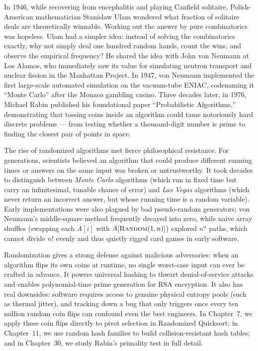 \begin{historybox}
In 1946, while recovering from encephalitis and playing Canfield solitaire, Polish-American
mathematician Stanislaw Ulam wondered what fraction of solitaire deals are theoretically winnable.
Working out the answer by pure combinatorics was hopeless. Ulam had a simpler idea:
instead of solving the combinatorics exactly, why not simply deal one hundred random hands, count the
wins, and observe the empirical frequency? He shared the idea with John von Neumann at Los Alamos,
who immediately saw its value for simulating neutron transport and nuclear fission in
the Manhattan Project. In 1947, von Neumann implemented the first large-scale automated simulation
on the vacuum-tube ENIAC, codenaming it ``Monte Carlo'' after the Monaco gambling casino. Three
decades later, in 1976, Michael Rabin published his foundational paper ``Probabilistic Algorithms,''
demonstrating that tossing coins inside an algorithm could tame notoriously hard discrete problems
--- from testing whether a thousand-digit number is prime to finding the closest pair of points in
space.

The rise of randomized algorithms met fierce philosophical resistance. For generations, scientists
believed an algorithm that could produce different running times or answers on the same input was
broken or untrustworthy. It took decades to distinguish between \emph{Monte Carlo} algorithms (which
run in fixed time but carry an infinitesimal, tunable chance of error) and \emph{Las Vegas}
algorithms (which never return an incorrect answer, but whose running time is a random variable).
Early implementations were also plagued by bad pseudo-random generators; von Neumann's middle-square
method frequently decayed into zero, while naive array shuffles (swapping each $A[i]$ with
$A[\textsc{Random}(1, n)]$) explored $n^n$ paths, which cannot divide $n!$ evenly and thus quietly
rigged card games in early software.

Randomization gives a strong defense against malicious adversaries: when an algorithm flips
its own coins at runtime, no single worst-case input can ever be crafted in advance. It powers
universal hashing to thwart denial-of-service attacks and enables polynomial-time prime generation
for RSA encryption. It also has real downsides: software requires access to genuine physical
entropy pools (such as thermal jitter), and tracking down a bug that only triggers once every ten
million random coin flips can confound even the best engineers. In Chapter~7, we apply these coin
flips directly to pivot selection in Randomized Quicksort; in Chapter~11, we use random hash families
to build collision-resistant hash tables; and in Chapter~30, we study Rabin's primality test in full
detail.
\end{historybox}

